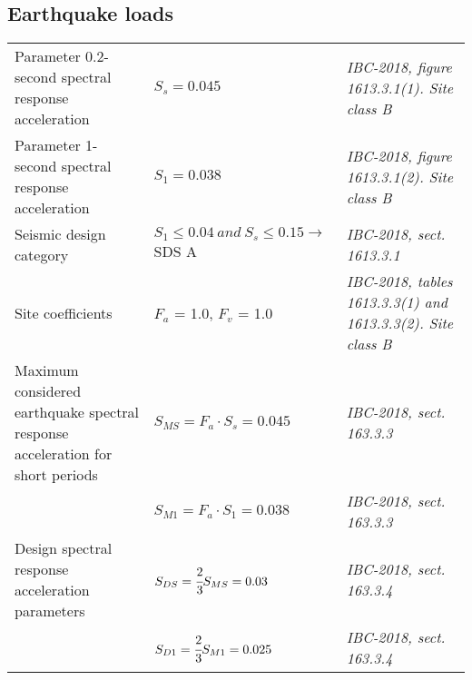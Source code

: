 \subsection{Earthquake loads}
\begin{tabular}{p{4cm}l|p{4cm}}
Parameter 0.2-second spectral response acceleration & $S_s = 0.045$ &  \emph{IBC-2018, figure 1613.3.1(1). Site class B} \\
Parameter 1-second spectral response acceleration & $S_1 = 0.038$ &  \emph{IBC-2018, figure 1613.3.1(2). Site class B} \\
Seismic design category & $S_1 \le 0.04\ and\  S_s \le 0.15 \rightarrow $ SDS A & \emph{IBC-2018, sect. 1613.3.1} \\
Site coefficients & $F_a$ = 1.0, $F_v$ = 1.0 & \emph{IBC-2018, tables 1613.3.3(1) and 1613.3.3(2). Site class  B} \\
Maximum considered earthquake spectral response acceleration for short periods & $S_{MS} = F_a\cdot S_s = 0.045$ &  \emph{IBC-2018, sect. 163.3.3} \\
& $S_{M1} = F_a\cdot S_1 = 0.038$ &  \emph{IBC-2018, sect. 163.3.3} \\
Design spectral response acceleration parameters & $S_{DS} = \cfrac{2}{3} S_{MS} = 0.03$ & \emph{IBC-2018, sect. 163.3.4} \\
& $S_{D1} = \cfrac{2}{3} S_{M1} = 0.025$ & \emph{IBC-2018, sect. 163.3.4} \\
\end{tabular}


